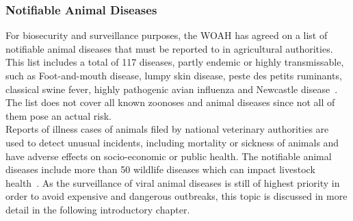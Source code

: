 \subsubsection*{Notifiable Animal Diseases}
For biosecurity and surveillance purposes, the \ac{WOAH} has agreed on a list of notifiable animal diseases that must be reported to in agricultural authorities. This list includes a total of 117 diseases, partly endemic or highly transmissable, such as Foot-and-mouth disease, lumpy skin disease, peste des petits ruminants, classical swine fever, highly pathogenic avian influenza and Newcastle disease~\cite{woah2023list}. The list does not cover all known zoonoses and animal diseases since not all of them pose an actual risk. \\
Reports of illness cases of animals filed by national veterinary authorities are used to detect unusual incidents, including mortality or sickness of animals and have adverse effects on socio-economic or public health. The notifiable animal diseases include more than 50 wildlife diseases which can impact livestock health~\cite{woah2023list}. As the surveillance of viral animal diseases is still of highest priority in order to avoid expensive and dangerous outbreaks, this topic is discussed in more detail in the following introductory chapter.

